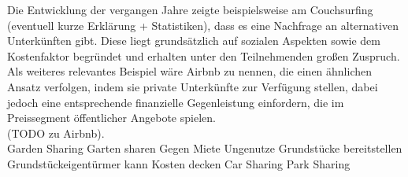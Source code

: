 Die Entwicklung der vergangen Jahre zeigte beispielsweise am Couchsurfing (eventuell kurze Erklärung + Statistiken), dass es eine Nachfrage an alternativen Unterkünften gibt. Diese liegt grundsätzlich auf sozialen Aspekten sowie dem Kostenfaktor begründet und erhalten unter den Teilnehmenden großen Zuspruch. Als weiteres relevantes Beispiel wäre Airbnb zu nennen, die einen ähnlichen Ansatz verfolgen, indem sie private Unterkünfte zur Verfügung stellen, dabei jedoch eine entsprechende finanzielle Gegenleistung einfordern, die im Preissegment öffentlicher Angebote spielen.\\
(TODO zu Airbnb).\\

Garden Sharing
Garten sharen
Gegen Miete
Ungenutze Grundstücke bereitstellen
Grundstückeigentürmer kann Kosten decken
Car Sharing
Park Sharing











